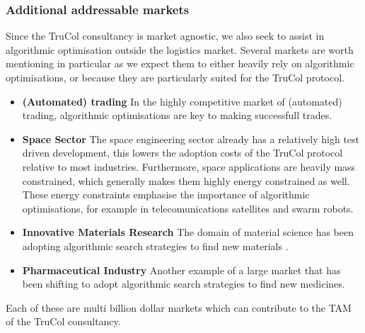 \subsubsection{Additional addressable markets}\label{subsubsec:additional_markets}
Since the TruCol consultancy is market agnostic, we also seek to assist in algorithmic optimisation outside the logistics market. Several markets are worth mentioning in particular as we expect them to either heavily rely on algorithmic optimisations, or because they are particularly suited for the TruCol protocol.
\begin{itemize}
	\item \textbf{(Automated) trading} In the highly competitive market of (automated) trading, algorithmic optimisations are key to making successfull trades. 
	\item \textbf{Space Sector} The space engineering sector already has a relatively high test driven development\cite{todo}, this lowers the adoption costs of the TruCol protocol relative to most industries. Furthermore, space applications are heavily mass constrained, which generally makes them highly energy constrained as well. These energy constraints emphasise the importance of algorithmic optimisations, for example in telecomunications satellites and swarm robots.
	\item \textbf{Innovative Materials Research} The domain of material science has been adopting algorithmic search strategies to find new materials  \cite{allahyari2020coevolutionary}.
	\item \textbf{Pharmaceutical Industry} Another example of a large market that has been shifting to adopt algorithmic search strategies to find new medicines.
\end{itemize}
Each of these are multi billion dollar markets which can contribute to the TAM of the TruCol consultancy.
